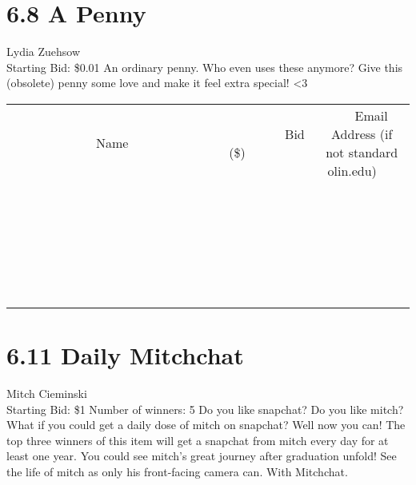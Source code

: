 \documentclass[11pt]{article}
\begin{document}
\section*{6.8 A Penny}
Lydia Zuehsow
\\
Starting Bid: \$0.01
\newline
An ordinary penny. Who even uses these anymore?
Give this (obsolete) penny some love and make it feel extra special! \textless 3
\\[6ex]
\begin{tabular}{c c c}
~~~~~~~~~~~~~Name~~~~~~~~~~~~~ & ~~~~~~~~~Bid (\$)~~~~~~~~~  & ~~~Email Address (if not standard olin.edu)~~~\\
 & & \\
\hline
 & & \\
\hline
 & & \\
\hline
 & & \\
\hline
 & & \\
\hline
 & & \\
\hline
 & & \\
\hline
 & & \\
\hline
 & & \\
\hline
 & & \\
\hline
 & & \\
\hline
 & & \\
\hline
 & & \\
\hline
 & & \\
\hline
 & & \\
\hline
 & & \\
\hline
 & & \\
\hline
 & & \\
\hline
 & & \\
\hline
 & & \\
\hline
 & & \\
\hline
 & & \\
\hline
 & & \\
\hline
 & & \\
\hline
 & & \\
\hline
 & & \\
\hline
\end{tabular}
\newpage
\section*{6.11 Daily Mitchchat}
Mitch Cieminski
\\
Starting Bid: \$1
\newline
Number of winners: 5
\newline
Do you like snapchat? Do you like mitch? What if you could get a daily dose of mitch on snapchat? Well now you can! The top three winners of this item will get a snapchat from mitch every day for at least one year. You could see mitch's great journey after graduation unfold! See the life of mitch as only his front-facing camera can. With Mitchchat.
\end{document}
